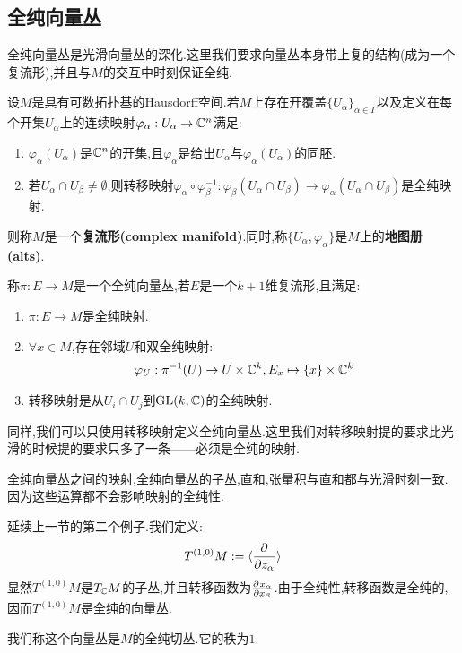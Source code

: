 \subsection*{全纯向量丛}
全纯向量丛是光滑向量丛的深化.这里我们要求向量丛本身带上复的结构(成为一个复流形),并且与$M$的交互中时刻保证全纯.
\begin{definition}[复流形]
	设$M$是具有可数拓扑基的Hausdorff空间.若$M$上存在开覆盖$\{U_\alpha\}_{\alpha \in \Gamma}$以及定义在每个开集$U_\alpha$上的连续映射$\varphi_\alpha:U_\alpha \to \mathbb{C}^n$满足:
	\begin{enumerate}
		\item $\varphi_\alpha(U_\alpha)$是$\mathbb{C}^n$的开集,且$\varphi_\alpha$是给出$U_\alpha$与$\varphi_\alpha(U_\alpha)$的同胚.
		\item 若$U_\alpha \cap U_\beta \neq \emptyset$,则转移映射$\varphi_\alpha \circ \varphi_{\beta}^{-1}:\varphi_\beta(U_\alpha \cap U_\beta) \to \varphi_\alpha(U_\alpha \cap U_\beta)$是全纯映射.
	\end{enumerate}
则称$M$是一个\textbf{复流形(complex manifold)}.同时,称$\{U_\alpha,\varphi_\alpha\}$是$M$上的\textbf{地图册(alts)}.
\end{definition}
\begin{definition}[全纯向量丛]
	称$\pi:E \to M$是一个全纯向量丛,若$E$是一个$k+1$维复流形,且满足:
	\begin{enumerate}
		\item $\pi:E \to M$是全纯映射.
		\item $\forall x \in M$,存在邻域$U$和双全纯映射:
		\begin{align*}
			\varphi_U:\pi^{-1}(U)\to U\times \mathbb{C}^k, E_x \mapsto \{x\} \times \mathbb{C}^k
		\end{align*}
		\item 转移映射是从$U_{i}\cap U_j$到$\mathrm{GL}(k,\mathbb{C})$的全纯映射.
	\end{enumerate}
\end{definition}

同样,我们可以只使用转移映射定义全纯向量丛.这里我们对转移映射提的要求比光滑的时候提的要求只多了一条——必须是全纯的映射.

全纯向量丛之间的映射,全纯向量丛的子丛,直和,张量积与直和都与光滑时刻一致.因为这些运算都不会影响映射的全纯性.

\begin{example}[全纯切丛]
	延续上一节的第二个例子.我们定义:
	\begin{align*}
		T^{(1,0)}M:=\langle \frac{\partial^{} }{\partial {z_\alpha}^{}}\rangle
	\end{align*}
	显然$T^{(1,0)}M$是$T_{\mathbb{C}}M$的子丛,并且转移函数为$\frac{\partial^{} x_\alpha}{\partial {x_\beta}^{}}$.由于全纯性,转移函数是全纯的,因而$T^{(1,0)}M$是全纯的向量丛.

	我们称这个向量丛是$M$的全纯切丛.它的秩为$1$.
\end{example}


